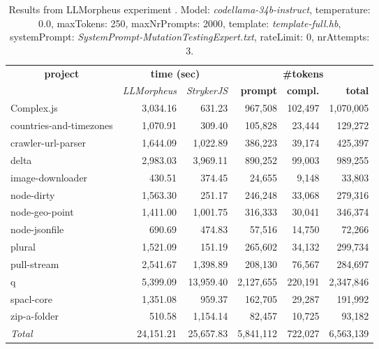 
\begin{table*}[hbt!]
\centering
{\scriptsize
\begin{tabular}{l||r|r|r|r|r}
\multicolumn{1}{c|}{\bf project} & \multicolumn{2}{|c|}{\bf time (sec)} & \multicolumn{3}{|c|}{\bf \#tokens} \\
               & {\it LLMorpheus} & {\it StrykerJS} & {\bf prompt} & {\bf compl.} & {\bf total} \\
\hline
  Complex.js & 3,034.16 & 631.23 & 967,508 & 102,497 & 1,070,005 \\ 
countries-and-timezones & 1,070.91 & 309.40 & 105,828 & 23,444 & 129,272 \\ 
crawler-url-parser & 1,644.09 & 1,022.89 & 386,223 & 39,174 & 425,397 \\ 
delta & 2,983.03 & 3,969.11 & 890,252 & 99,003 & 989,255 \\ 
image-downloader & 430.51 & 374.45 & 24,655 & 9,148 & 33,803 \\ 
node-dirty & 1,563.30 & 251.17 & 246,248 & 33,068 & 279,316 \\ 
node-geo-point & 1,411.00 & 1,001.75 & 316,333 & 30,041 & 346,374 \\ 
node-jsonfile & 690.69 & 474.83 & 57,516 & 14,750 & 72,266 \\ 
plural & 1,521.09 & 151.19 & 265,602 & 34,132 & 299,734 \\ 
pull-stream & 2,541.67 & 1,398.89 & 208,130 & 76,567 & 284,697 \\ 
q & 5,399.09 & 13,959.40 & 2,127,655 & 220,191 & 2,347,846 \\ 
spacl-core & 1,351.08 & 959.37 & 162,705 & 29,287 & 191,992 \\ 
zip-a-folder & 510.58 & 1,154.14 & 82,457 & 10,725 & 93,182 \\ 
\hline
  \textit{Total} & 24,151.21 & 25,657.83 & 5,841,112 & 722,027 & 6,563,139 \\
  \end{tabular}
  }
  \\[2mm]
  \caption{Results from LLMorpheus experiment .
    Model: \textit{codellama-34b-instruct}, 
    temperature: 0.0, 
    maxTokens: 250, 
    maxNrPrompts: 2000, 
    template: \textit{template-full.hb}, 
    systemPrompt: \textit{SystemPrompt-MutationTestingExpert.txt}, 
    rateLimit: 0, 
    nrAttempts: 3.  
  }
  \label{table:Cost:run316:codellama-34b-instruct:template-full.hb:0.0}
\end{table*}